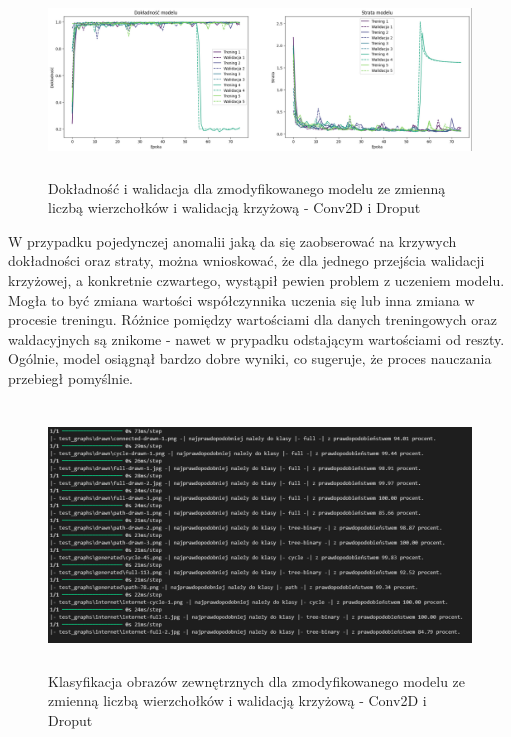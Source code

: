 \begin{figure}[ht]
	\centering
	\includegraphics[height=5cm]{resources/tests/images/v4/multiple_edges_crossvalid_1_img.png}
	\caption{Dokładność i walidacja dla zmodyfikowanego modelu ze zmienną liczbą wierzchołków i walidacją krzyżową - Conv2D i Droput}
	\label{Fig:tests-csvar-1a}
\end{figure}
\FloatBarrier

W przypadku pojedynczej anomalii jaką da się zaobserować na krzywych dokładności oraz straty,
można wnioskować, że dla jednego przejścia walidacji krzyżowej, a konkretnie czwartego, wystąpił pewien problem z uczeniem modelu.
Mogła to być zmiana wartości współczynnika uczenia się lub inna zmiana w procesie treningu.
Różnice pomiędzy wartościami dla danych treningowych oraz waldacyjnych są znikome - nawet w prypadku odstającym wartościami od reszty.
Ogólnie, model osiągnął bardzo dobre wyniki, co sugeruje, że proces nauczania przebiegł pomyślnie.

\begin{figure}[ht]
	\centering
	\includegraphics[height=7cm]{resources/tests/images/v4/multiple_edges_crossvalid_1_txt.png}
	\caption{Klasyfikacja obrazów zewnętrznych dla zmodyfikowanego modelu ze zmienną liczbą wierzchołków i walidacją krzyżową - Conv2D i Droput}
	\label{Fig:tests-csvar-1b}
\end{figure}
\FloatBarrier

